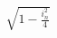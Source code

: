 \documentclass[preview]{standalone}
\begin{document}
\begin{align*}
\sqrt{1 - \frac{i_n^2}{4}}
\end{align*}
\end{document}
